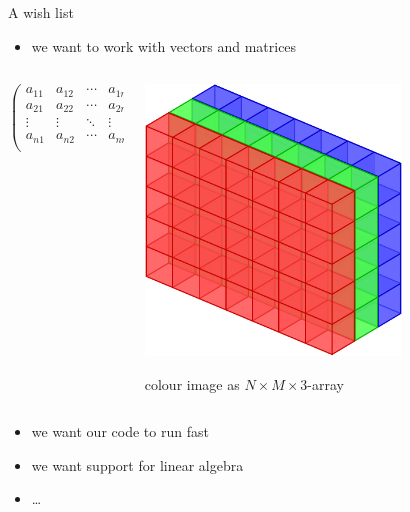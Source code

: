 \documentclass{beamer}
\begin{document}
\begin{frame}{A wish list}
 \begin{itemize}
  \item we want to work with vectors and matrices
 \end{itemize}

 \begin{columns}
  \begin{column}{0.55\textwidth}
   \begin{displaymath}
    \begin{pmatrix}
     a_{11} & a_{12} & \cdots & a_{1n}\\
     a_{21} & a_{22} & \cdots & a_{2n}\\
     \vdots & \vdots & \ddots & \vdots\\
     a_{n1} & a_{n2} & \cdots & a_{nn}\\
    \end{pmatrix}
   \end{displaymath}
  \end{column}%
  \begin{column}{0.45\textwidth}
   \includegraphics[width=0.7\textwidth]{rgbarray}

   colour image as $N\times M\times3$-array
  \end{column}
 \end{columns}

 \begin{itemize}
  \item we want our code to run fast
  \item we want support for linear algebra
  \item \dots 
 \end{itemize}
\end{frame}
\end{document}
